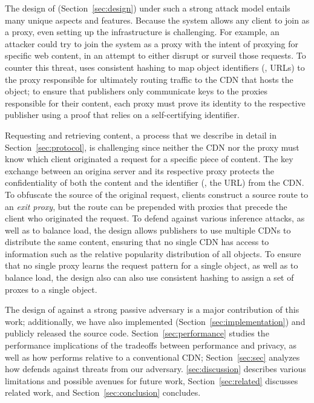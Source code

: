 The design of \system{} (Section~\ref{sec:design}) under such a strong attack
model entails many unique aspects and features. Because the system allows any
client to join as a proxy, even setting up the infrastructure is challenging.
For example, an attacker could try to join the system as a proxy with the
intent of proxying for specific web content, in an attempt to either disrupt
or surveil those requests. To counter this threat, \system{} uses consistent
hashing to map object identifiers (\ie, URLs) to the proxy responsible for
ultimately routing traffic to the CDN that hosts the object; to ensure that
publishers only communicate keys to the proxies responsible for their content,
each proxy must prove its identity to the respective publisher using a proof
that relies on a self-certifying identifier. 

Requesting and retrieving content, a process that we describe in detail in
Section~\ref{sec:protocol}, is challenging since neither the CDN nor the proxy
must know which client originated a request for a specific piece of content.
The key exchange between an origina server and its respective proxy protects
the confidentiality of both the content and the identifier (\ie, the URL) from
the CDN. To obfuscate the source of the original request, clients construct a
source route to an {\em exit proxy}, but the route can be prepended with
proxies that precede the client who originated the request. To defend against
various inference attacks, as well as to balance load, the \system{} design
allows publishers to use multiple CDNs to distribute the same content,
ensuring that no single CDN has access to information such as the relative
popularity distribution of all objects. To ensure that no single proxy learns
the request pattern for a single object, as well as to balance load, the
design also can also use consistent hashing to assign a set of proxes to a
single object. 

The design of \system{} against a strong passive adversary is a major
contribution of this work; additionally, we have also implemented \system{}
(Section~\ref{sec:implementation}) and publicly released the source code.
Section~\ref{sec:performance} studies the performance implications of the
tradeoffs between performance and privacy, as well as how \system{} performs
relative to a conventional CDN; Section~\ref{sec:sec} analyzes how \system{}
defends against threats from our adversary.
\ref{sec:discussion} describes various
limitations and possible avenues for future work, Section~\ref{sec:related}
discusses related work, and Section~\ref{sec:conclusion} concludes.


